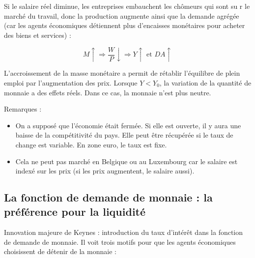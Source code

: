 	Si le salaire réel diminue, les entreprises embauchent les chômeurs qui sont su r le marché du travail, donc la production augmente ainsi que la demande agrégée (car les agents économiques détiennent plus d'encaisses monétaires pour acheter des biens et services) :
	
	$$M \uparrow \Rightarrow \frac{W}{P} \downarrow \Rightarrow Y \uparrow \text{ et } DA \uparrow$$
	
	L'accroissement de la masse monétaire a permit de rétablir l'équilibre de plein emploi par l'augmentation des prix. Lorsque $Y < Y_0$, la variation de la quantité de monnaie a des effets réels. Dans ce cas, la monnaie n'est plus neutre.
	
	Remarques :
	
	\begin{itemize}
		\item On a supposé que l'économie était fermée. Si elle est ouverte, il y aura une baisse de la compétitivité du pays. Elle peut être récupérée si le taux de change est variable. En zone euro, le taux est fixe.
		\item Cela ne peut pas marché en Belgique ou au Luxembourg car le salaire est indexé sur les prix (si les prix augmentent, le salaire aussi).
	\end{itemize}
	
	
	
	\subsection{La fonction de demande de monnaie : la préférence pour la liquidité}
	
	Innovation majeure de Keynes : introduction du taux d'intérêt dans la fonction de demande de monnaie. Il voit trois motifs pour que les agents économiques choisissent de détenir de la monnaie :
	
